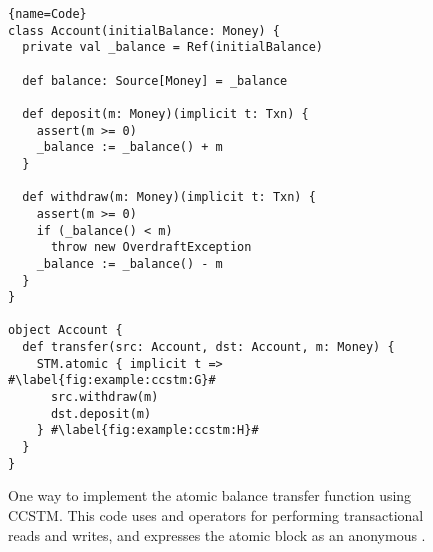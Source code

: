 \begin{figure}
\begin{lstlisting}{name=Code}
class Account(initialBalance: Money) {
  private val _balance = Ref(initialBalance)

  def balance: Source[Money] = _balance

  def deposit(m: Money)(implicit t: Txn) {
    assert(m >= 0)
    _balance := _balance() + m
  }

  def withdraw(m: Money)(implicit t: Txn) {
    assert(m >= 0)
    if (_balance() < m)
      throw new OverdraftException
    _balance := _balance() - m
  }
}

object Account {
  def transfer(src: Account, dst: Account, m: Money) {
    STM.atomic { implicit t => #\label{fig:example:ccstm:G}#
      src.withdraw(m)
      dst.deposit(m)
    } #\label{fig:example:ccstm:H}#
  }
}
\end{lstlisting}

\caption{One way to implement the atomic balance transfer function
using CCSTM.  This code uses  and \code{:=} operators
for performing transactional reads and writes, and expresses the atomic
block as an anonymous .}

\label{fig:example:ccstm}
\end{figure}
